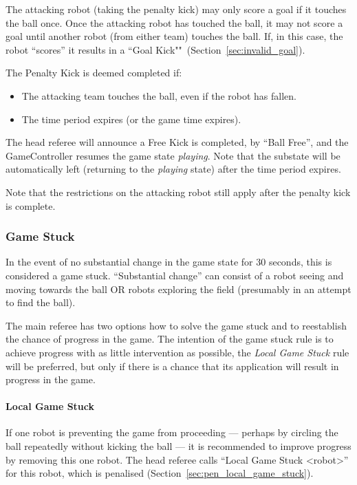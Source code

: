 The attacking robot (taking the penalty kick) may only score a goal if it touches the ball once. Once the attacking robot has touched the ball, it may not score a goal until another robot (from either team) touches the ball. If, in this case, the robot ``scores'' it results in a ``Goal Kick""~(\cf Section~\ref{sec:invalid_goal}).

The Penalty Kick is deemed completed if:
\begin{itemize}
\item The attacking team touches the ball, even if the robot has fallen.
\item The \PenaltyFreeKickTime time period expires (or the game time expires).
\end{itemize}

The head referee will announce a Free Kick is completed, by ``Ball Free'', and the GameController resumes the game state \emph{playing}. Note that the substate will be automatically left (returning to the \textit{playing} state) after the \PenaltyFreeKickTime time period expires.

Note that the restrictions on the attacking robot still apply after the penalty kick is complete.

\subsubsection{Game Stuck}
\label{sec:game_stuck}

In the event of no substantial change in the game state for 30 seconds, this is considered a game stuck. ``Substantial change'' can consist of a robot seeing and moving towards the ball OR robots exploring the field (presumably in an attempt to find the ball).

The main referee has two options how to solve the game stuck and to reestablish the chance of progress in the game. The intention of the game stuck rule is to achieve progress with as little intervention as possible, \ie the \emph{Local Game Stuck} rule will be preferred, but only if there is a chance that its application will result in progress in the game.

\paragraph{Local Game Stuck}
\label{sec:game_stuck:local}

If one robot is preventing the game from proceeding --- perhaps by circling the ball repeatedly without kicking the ball --- it is recommended to improve progress by removing this one robot.
The head referee calls ``Local Game Stuck \textless robot\textgreater'' for this robot, which is penalised (\cf Section~\ref{sec:pen_local_game_stuck}).

